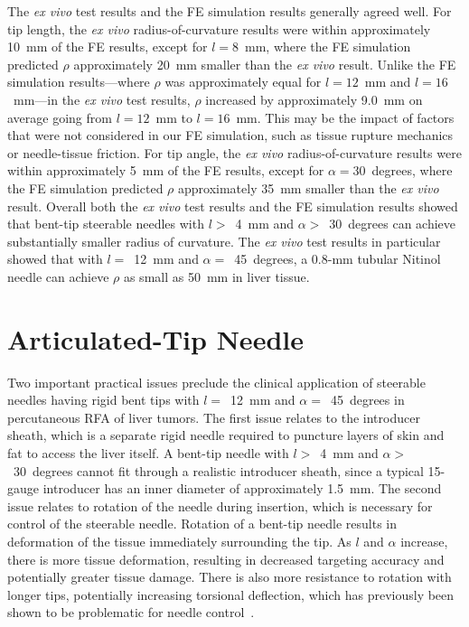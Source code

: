 The \textit{ex vivo} test results and the FE simulation results generally agreed well. For tip length, the \textit{ex vivo} radius-of-curvature results were within approximately 10~mm of the FE results, except for $l = 8$~mm, where the FE simulation predicted $\rho$ approximately 20~mm smaller than the \textit{ex vivo} result. Unlike the FE simulation results---where $\rho$ was approximately equal for $l = 12$~mm and $l = 16$~mm---in the \textit{ex vivo} test results, $\rho$ increased by approximately 9.0~mm on average going from $l = 12$~mm to $l = 16$~mm. This may be the impact of factors that were not considered in our FE simulation, such as tissue rupture mechanics or needle-tissue friction. For tip angle, the \textit{ex vivo} radius-of-curvature results were within approximately 5~mm of the FE results, except for $\alpha = 30$~degrees, where the FE simulation predicted $\rho$ approximately 35~mm smaller than the \textit{ex vivo} result. Overall both the \textit{ex vivo} test results and the FE simulation results showed that bent-tip steerable needles with $l >$~4~mm and $\alpha >$~30~degrees can achieve substantially smaller radius of curvature. The \textit{ex vivo} test results in particular showed that with $l =$~12~mm and $\alpha =$~45~degrees, a 0.8-mm tubular Nitinol needle can achieve $\rho$ as small as 50~mm in liver tissue.

\section{Articulated-Tip Needle}
\label{sec:Articulated-TipNeedle}
Two important practical issues preclude the clinical application of steerable needles having rigid bent tips with $l =$~12~mm and $\alpha =$~45~degrees in percutaneous RFA of liver tumors. The first issue relates to the introducer sheath, which is a separate rigid needle required to puncture layers of skin and fat to access the liver itself. A bent-tip needle with $l >$~4~mm and $\alpha >$~30~degrees cannot fit through a realistic introducer sheath, since a typical 15-gauge introducer has an inner diameter of approximately 1.5~mm. The second issue relates to rotation of the needle during insertion, which is necessary for control of the steerable needle. Rotation of a bent-tip needle results in deformation of the tissue immediately surrounding the tip. As $l$ and $\alpha$ increase, there is more tissue deformation, resulting in decreased targeting accuracy and potentially greater tissue damage. There is also more resistance to rotation with longer tips, potentially increasing torsional deflection, which has previously been shown to be problematic for needle control~\cite{Reed2009}.

